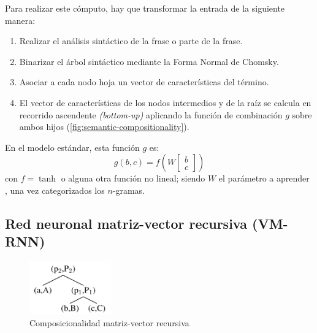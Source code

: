 Para realizar este cómputo, hay que transformar la entrada de la siguiente manera:
\begin{enumerate}
\item Realizar el análisis sintáctico de la frase o parte de la frase.
\item Binarizar el árbol sintáctico mediante la Forma Normal de Chomsky.
\item Asociar a cada nodo hoja un vector de características del término.
\item El vector de características de los nodos intermedios y de la raíz se calcula en recorrido ascendente \emph{(bottom-up)} aplicando la función de combinación $g$ sobre ambos hijos (\autoref{fig:semantic-compositionality}).
\end{enumerate}

En el modelo estándar, esta función $g$ es:
\begin{equation}
g(b, c) = f\left(W \left[\begin{array}{c}b \\c\end{array}\right] \right)
\end{equation}
con $f=\tanh$ o alguna otra función no lineal; siendo $W$ el parámetro a aprender \citep{Socher2013}, una vez categorizados los $n$-gramas.

\FloatBarrier
\subsection{Red neuronal matriz-vector recursiva (VM-RNN)} 

\begin{figure}[htbp]
\centering
\includegraphics[width=3.5cm]{semantic-compositionality-vm}
\caption[Composicionalidad matriz-vector recursiva]{Composicionalidad matriz-vector recursiva \citep{Socher2013}}
\label{fig:semantic-compositionality-vm}
\end{figure}

